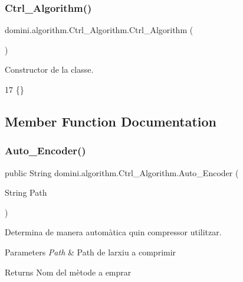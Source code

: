 \subsubsection{\texorpdfstring{Ctrl\+\_\+\+Algorithm()}{Ctrl\_Algorithm()}}
{\footnotesize\ttfamily domini.\+algorithm.\+Ctrl\+\_\+\+Algorithm.\+Ctrl\+\_\+\+Algorithm (\begin{DoxyParamCaption}{ }\end{DoxyParamCaption})\hspace{0.3cm}{\ttfamily [inline]}}



Constructor de la classe. 


\begin{DoxyCode}
17 \{\}
\end{DoxyCode}


\subsection{Member Function Documentation}
\mbox{\label{classdomini_1_1algorithm_1_1Ctrl__Algorithm_a6f7a706e07d4e6f8c1ea293d06e17318}} 
\subsubsection{\texorpdfstring{Auto\+\_\+\+Encoder()}{Auto\_Encoder()}}
{\footnotesize\ttfamily public String domini.\+algorithm.\+Ctrl\+\_\+\+Algorithm.\+Auto\+\_\+\+Encoder (\begin{DoxyParamCaption}\item[{String}]{Path }\end{DoxyParamCaption})\hspace{0.3cm}{\ttfamily [inline]}}



Determina de manera automàtica quin compressor utilitzar. 


\begin{DoxyParams}{Parameters}
{\em Path} & Path de l\textquotesingle{}arxiu a comprimir \\
\hline
\end{DoxyParams}
\begin{DoxyReturn}{Returns}
Nom del mètode a emprar 
\end{DoxyReturn}

